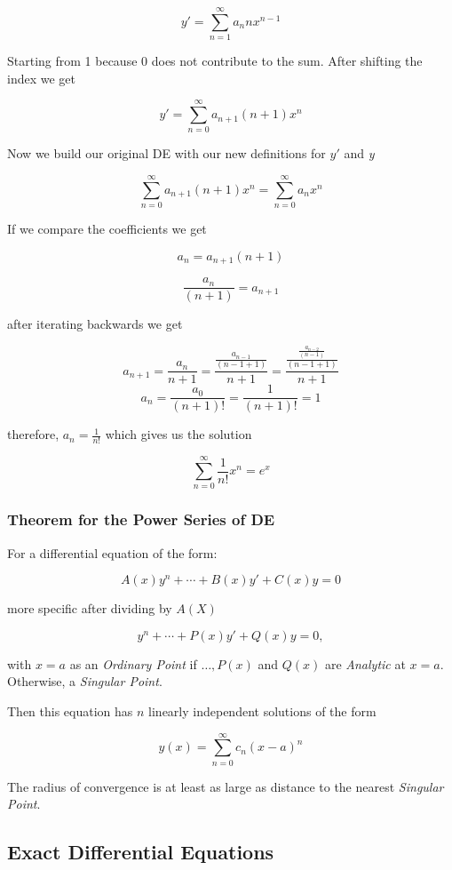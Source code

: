 \[
    y' = \sum_{n = 1}^{\infty} a_n n x^{n - 1}
\]

Starting from 1 because 0 does not contribute to the sum. After shifting the index we get

\[
    y' = \sum_{n = 0}^{\infty} a_{n + 1}(n + 1)x^{n}
\]

Now we build our original DE with our new definitions for \(y'\) and \emph{y}

\[
    \sum_{n = 0}^{\infty} a_{n + 1}(n + 1)x^{n} = \sum_{n = 0}^{\infty} a_n x^n
\]

If we compare the coefficients we get

\[
    a_n = a_{n+1}(n+1)
\]

\[
    \frac{a_n}{(n + 1)} = a_{n+1}
\]


after iterating backwards we get

\[
    a_{n + 1} = \frac{a_n}{n + 1} = \frac{\frac{a_{n - 1}}{(n - 1 +1)}}{n + 1} = 
    \frac{\frac{\frac{a_{n - 2}}{(n - 1)}}{(n - 1 + 1)}}{n + 1}   
\]
\[
    a_n = \frac{a_0}{(n + 1)!} = \frac{1}{(n + 1)!} = 1
\]

therefore, \(a_n = \frac{1}{n!}\) which gives us the solution

\[
    \sum_{n = 0}^{\infty}\frac{1}{n!}x^n = e^x
\]

\subsubsection{Theorem for the Power Series of DE}

For a differential equation of the form:

\[
    A(x)y^{n} + \cdots + B(x)y' + C(x)y = 0
\]

more specific after dividing by \(A(X)\)

\[
    y^{n} + \cdots + P(x)y' + Q(x)y = 0,
\]

with \(x = a\) as an \emph{Ordinary Point} if \(\dots, P(x)\) and \(Q(x)\) are 
\emph{Analytic} at \(x = a\). Otherwise, a \emph{Singular Point}.
\vspace{\baselineskip}

Then this equation has \(n\) linearly independent solutions of the form

\[
    y(x) = \sum_{n = 0}^{\infty} c_n {(x - a)}^n
\]

The radius of convergence is at least as large as distance to the nearest \emph{Singular Point}.

\subsection{Exact Differential Equations}

